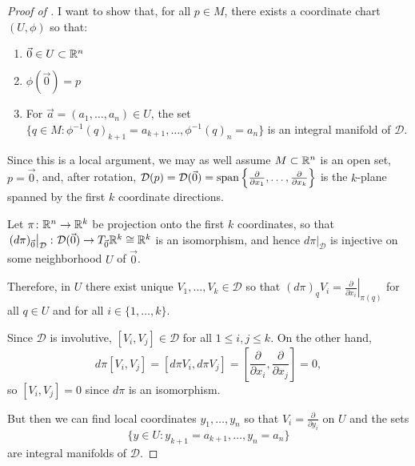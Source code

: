 \begin{proof}[Proof of ]
	I want to show that, for all $p \in M$, there exists a coordinate chart $(U,\phi)$ so that:
	\begin{enumerate}
		\item $\vec{0} \in U \subset \mathbb{R}^n$
		\item $\phi(\vec{0})=p$
		\item For $\vec{a} = (a_1, \dots , a_n) \in U$, the set $\{q \in M : \phi^{-1}(q)_{k+1} = a_{k+1}, \dots , \phi^{-1}(q)_n = a_n\}$ is an integral manifold of $\mathcal{D}$.
	\end{enumerate}
	
	Since this is a local argument, we may as well assume $M \subset \mathbb{R}^n$ is an open set, $p = \vec{0}$, and, after rotation, $\mathcal{D}(p) = \mathcal{D}(\vec{0}) = \operatorname{span} \left\{ \frac{\partial}{\partial x_1} , \dots , \frac{\partial}{\partial x_k}\right\}$ is the $k$-plane spanned by the first $k$ coordinate directions.
	
	Let $\pi \colon\thinspace\! \mathbb{R}^n \to \mathbb{R}^k$ be projection onto the first $k$ coordinates, so that $\left. (d\pi)_{\vec{0}}\right|_{\mathcal{D}} \colon\thinspace\! \mathcal{D}(\vec{0}) \to T_{\vec{0}} \mathbb{R}^k \cong \mathbb{R}^k$ is an isomorphism, and hence $\left. d\pi\right|_{\mathcal{D}}$ is injective on some neighborhood $U$ of $\vec{0}$.
	
	Therefore, in $U$ there exist unique $V_1, \dots , V_k \in \mathcal{D}$ so that $(d\pi)_q V_i = \left. \frac{\partial}{\partial x_i} \right|_{\pi(q)}$ for all $q \in U$ and for all $i \in \{1 , \dots , k\}$.
	
	Since $\mathcal{D}$ is involutive, $[V_i, V_j ] \in \mathcal{D}$ for all $1 \leq i, j \leq k$. On the other hand,
	\[
		d\pi[V_i,V_j] = [d\pi V_i, d\pi V_j] = \left[\frac{\partial}{\partial x_i}, \frac{\partial}{\partial x_j}\right] = 0,
	\]
	so $[V_i,V_j]= 0$ since $d\pi$ is an isomorphism.
	
	But then we can find local coordinates $y_1, \dots , y_n$ so that $V_i = \frac{\partial}{\partial y_i}$ on $U$ and the sets
	\[
		\{y \in U : y_{k+1} = a_{k+1}, \dots , y_n = a_n \}
	\]
	are integral manifolds of $\mathcal{D}$.
\end{proof}

